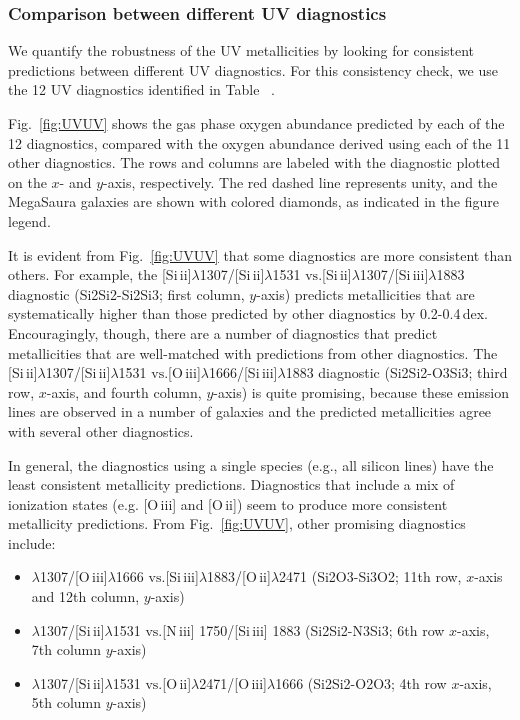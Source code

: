 \documentclass[preprint2]{aastex62}
\newcommand{\niii}{[N\,{\sc iii}]\xspace}
\newcommand{\oiii}{[O\,{\sc iii}]\xspace}
\newcommand{\oii}{[O\,{\sc ii}]\xspace}
\newcommand{\SiuII}{[Si\,{\sc ii}]\xspace}
\newcommand{\SiuIII}{[Si\,{\sc iii}]\xspace}
\newcommand\vs{\ensuremath{\mathrm{vs.}}\xspace}
\newcommand{\mage}{{\sc Meg}a{\sc S}a{\sc ura}\xspace}
\newcommand{\XXX}{{\bf \color{red}{XXX} }}
\begin{document}
\subsubsection{Comparison between different UV diagnostics}\label{sec:UVOpt:UV}

We quantify the robustness of the UV metallicities by looking for consistent predictions between different UV diagnostics. For this consistency check, we use the 12 UV diagnostics identified in Table~\XXX.

Fig.~\ref{fig:UVUV} shows the gas phase oxygen abundance predicted by each of the 12 diagnostics, compared with the oxygen abundance derived using each of the 11 other diagnostics. The rows and columns are labeled with the diagnostic plotted on the $x$- and $y$-axis, respectively. The red dashed line represents unity, and the \mage galaxies are shown with colored diamonds, as indicated in the figure legend.

It is evident from Fig.~\ref{fig:UVUV} that some diagnostics are more consistent than others. For example, the \SiuII$\lambda$1307/\SiuII$\lambda$1531 \vs \SiuII$\lambda$1307/\SiuIII$\lambda$1883 diagnostic (Si2Si2-Si2Si3; first column, $y$-axis) predicts metallicities that are systematically higher than those predicted by other diagnostics by 0.2-0.4\,dex. Encouragingly, though, there are a number of diagnostics that predict metallicities that are well-matched with predictions from other diagnostics. The \SiuII$\lambda$1307/\SiuII$\lambda$1531 \vs \oiii$\lambda$1666/\SiuIII$\lambda$1883 diagnostic (Si2Si2-O3Si3; third row, $x$-axis, and fourth column, $y$-axis) is quite promising, because these emission lines are observed in a number of galaxies and the predicted metallicities agree with several other diagnostics.

In general, the diagnostics using a single species (e.g., all silicon lines) have the least consistent metallicity predictions. Diagnostics that include a mix of ionization states (e.g. \oiii and \oii) seem to produce more consistent metallicity predictions. From Fig.~\ref{fig:UVUV}, other promising diagnostics include:
\begin{itemize}
    \item \SiuII$\lambda$1307/\oiii$\lambda$1666 \vs \SiuIII$\lambda$1883/\oii$\lambda$2471 (Si2O3-Si3O2; 11th row, $x$-axis and 12th column, $y$-axis)
    \item \SiuII$\lambda$1307/\SiuII$\lambda$1531 \vs \niii1750/\SiuIII1883 (Si2Si2-N3Si3; 6th row $x$-axis, 7th column $y$-axis)
    \item \SiuII$\lambda$1307/\SiuII$\lambda$1531 \vs \oii$\lambda$2471/\oiii$\lambda$1666 (Si2Si2-O2O3; 4th row $x$-axis, 5th column $y$-axis)
\end{itemize}
\end{document}
